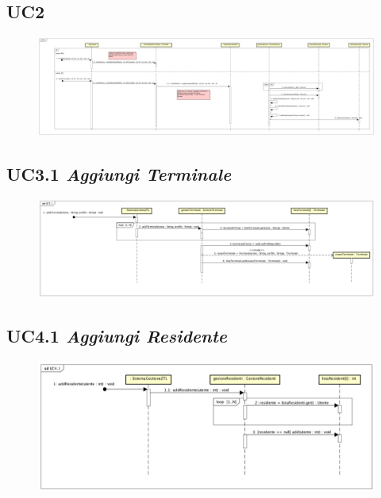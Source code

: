 \documentclass[12pt, letterpaper]{article}
\begin{document}
\subsection{UC2}
\begin{figure}[H]
    \centering
    \includegraphics[scale=0.10]{UC2-DI}
    \label{fig:mesh1}
\end{figure}

\subsection{UC3.1 \emph{Aggiungi Terminale}}
\begin{figure}[H]
    \centering
    \includegraphics[scale=0.20]{UC3.1-DI}
    \label{fig:mesh1}
\end{figure}

\subsection{UC4.1 \emph{Aggiungi Residente}}
\begin{figure}[H]
    \centering
    \includegraphics[scale=0.30]{UC4.1-DI}
    \label{fig:mesh1}
\end{figure}
\end{document}
